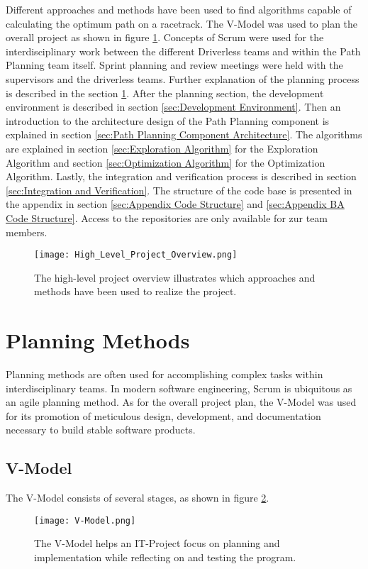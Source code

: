 Different approaches and methods have been used to find algorithms capable of calculating the optimum path on a racetrack. The V-Model was used to plan the overall project as shown in figure \ref{fig:High Level Project Overview}. Concepts of Scrum were used for the interdisciplinary work between the different Driverless teams and within the Path Planning team itself. Sprint planning and review meetings were held with the supervisors and the driverless teams. Further explanation of the planning process is described in the section \ref{sec:Planning Methods}. After the planning section, the development environment is described in section \ref{sec:Development Environment}. Then an introduction to the architecture design of the Path Planning component is explained in section \ref{sec:Path Planning Component Architecture}. The algorithms are explained in section \ref{sec:Exploration Algorithm} for the Exploration Algorithm and section \ref{sec:Optimization Algorithm} for the Optimization Algorithm. Lastly, the integration and verification process is described in section \ref{sec:Integration and Verification}.
The structure of the code base is presented in the appendix in section \ref{sec:Appendix Code Structure} and \ref{sec:Appendix BA Code Structure}. Access to the repositories are only available for \acrlong{zur} team members.
\begin{figure}[H]
    \centering
    \texttt{[image: High\_Level\_Project\_Overview.png]}
    \caption{The high-level project overview illustrates which approaches and methods have been used to realize the project.}
    \label{fig:High Level Project Overview}
\end{figure}

\section{Planning Methods} \label{sec:Planning Methods}
Planning methods are often used for accomplishing complex tasks within interdisciplinary teams. In modern software engineering, Scrum is ubiquitous as an agile planning method. As for the overall project plan, the V-Model was used for its promotion of meticulous design, development, and documentation necessary to build stable software products. \cite{what_is_v_model}

\subsection{V-Model} \label{sec:Planning Method: V-Model}
The V-Model consists of several stages, as shown in figure \ref{fig:V-Model}.
\begin{figure}[H]
    \centering
    \texttt{[image: V-Model.png]}
    \caption{The V-Model helps an IT-Project focus on planning and implementation while reflecting on and testing the program.}
    \label{fig:V-Model}
\end{figure}

